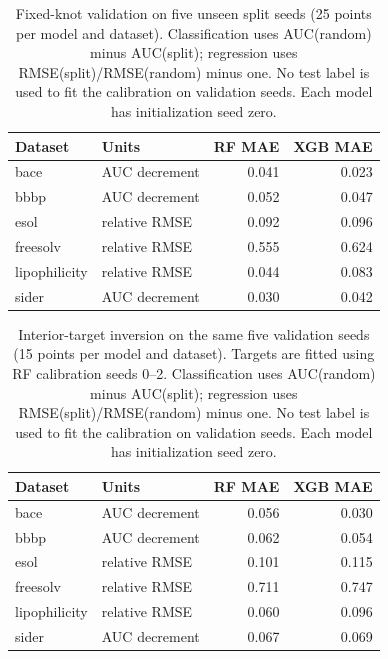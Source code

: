 \begin{table}[htbp]\centering\small
\begin{tabular}{llrr}
\toprule
Dataset & Units & RF MAE & XGB MAE \\
\midrule
bace & AUC decrement & 0.041 & 0.023 \\
bbbp & AUC decrement & 0.052 & 0.047 \\
esol & relative RMSE & 0.092 & 0.096 \\
freesolv & relative RMSE & 0.555 & 0.624 \\
lipophilicity & relative RMSE & 0.044 & 0.083 \\
sider & AUC decrement & 0.030 & 0.042 \\
\bottomrule
\end{tabular}

\caption{Fixed-knot validation on five unseen split seeds (25 points per model and dataset). Classification uses AUC(random) minus AUC(split); regression uses RMSE(split)/RMSE(random) minus one. No test label is used to fit the calibration on validation seeds. Each model has initialization seed zero.}\end{table}
\begin{table}[htbp]\centering\small
\begin{tabular}{llrr}
\toprule
Dataset & Units & RF MAE & XGB MAE \\
\midrule
bace & AUC decrement & 0.056 & 0.030 \\
bbbp & AUC decrement & 0.062 & 0.054 \\
esol & relative RMSE & 0.101 & 0.115 \\
freesolv & relative RMSE & 0.711 & 0.747 \\
lipophilicity & relative RMSE & 0.060 & 0.096 \\
sider & AUC decrement & 0.067 & 0.069 \\
\bottomrule
\end{tabular}

\caption{Interior-target inversion on the same five validation seeds (15 points per model and dataset). Targets are fitted using RF calibration seeds 0--2. Classification uses AUC(random) minus AUC(split); regression uses RMSE(split)/RMSE(random) minus one. No test label is used to fit the calibration on validation seeds. Each model has initialization seed zero.}\end{table}
